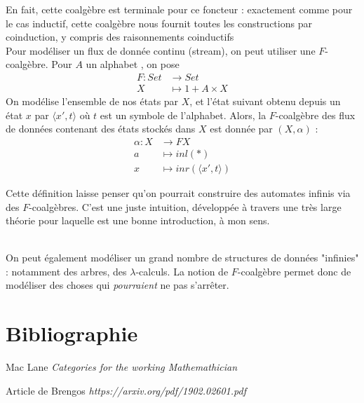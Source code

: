 \documentclass{article}
\begin{document}
En fait, cette coalgèbre est terminale pour ce foncteur : exactement comme pour le cas inductif, cette coalgèbre nous fournit toutes les constructions par coinduction, y compris des raisonnements coinductifs
\\

Pour modéliser un flux de donnée continu (stream), on peut utiliser une $F$-coalgèbre. Pour $A$ un alphabet ,  on pose
\begin{align*}
    F : Set & \rightarrow Set \\ 
        X & \mapsto 1 + A \times X
\end{align*}
On modélise l'ensemble de nos états par $X$, et l'état suivant obtenu depuis un état $x$ par $\langle x', t \rangle $ où $t$ est un symbole de l'alphabet.
Alors, la $F$-coalgèbre des flux de données contenant des états stockés dans $X$  est donnée par $(X,\alpha)$  : 
\begin{align*}
    \alpha : X & \rightarrow FX \\ 
             a & \mapsto inl(*) \\
             x & \mapsto inr(\langle x', t \rangle)
\end{align*}

Cette définition laisse penser qu'on pourrait construire des automates infinis via des $F$-coalgèbres. C'est une juste intuition, développée à travers une très large théorie pour laquelle \cite{Cet article} est une bonne introduction, à mon sens. 

\\ 

On peut également modéliser un grand nombre de structures de données "infinies" : notamment des arbres, des $\lambda$-calculs. La notion de $F$-coalgèbre permet donc de modéliser des choses qui \textit{pourraient} ne pas s'arrêter. 
    
\section{Bibliographie}

\begin{thebibliography}{9}

Mac Lane \emph{Categories for the working Mathemathician}

Article de Brengos \emph{https://arxiv.org/pdf/1902.02601.pdf}


\end{thebibliography}
\end{document}

